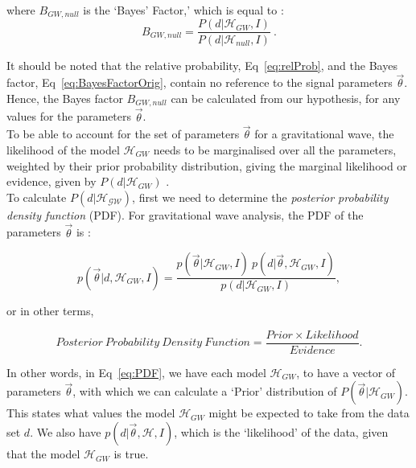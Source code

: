 \documentclass{article}
\begin{document}
   where $B_{GW, null}$ is the `Bayes' Factor,' which is equal to \cite{BaeStats}:\\
  \begin{equation} \label{eq:BayesFactorOrig}
  B_{GW, null} = \frac{P(d|  \mathcal{H}_{GW},I)}{P(d|  \mathcal{H}_{null},I)} \ .
  \end{equation}
 
It should be noted that the relative probability, Eq~\ref{eq:relProb}, and the Bayes factor, Eq~\ref{eq:BayesFactorOrig}, contain no reference to the signal parameters $\vec{\theta}$. Hence, the Bayes factor $B_{GW, null}$ can be calculated from our hypothesis, for any values for the parameters $\vec{\theta}$.\\

 To be able to account for the set of parameters $\vec{\theta}$ for a gravitational wave, the likelihood of the model $\mathcal{H}_{GW}$ needs to be marginalised over all the parameters, weighted by their prior probability distribution, giving the marginal likelihood or evidence, given by $P(d|\mathcal{H}_{GW})$  \cite{BaeStats}.\\
 

To calculate $P(d|\mathcal{H_{GW}})$, first we need to determine the \textit{posterior probability density function} (PDF). For gravitational wave analysis, the PDF of the parameters $\vec{\theta}$ is \cite{RSmith}:

\begin{equation} \label{eq:PDF}
p(\vec{\theta}|d, \mathcal{H}_{GW}, I)  = \frac{p(\vec{\theta}| \mathcal{H}_{GW}, I) \ p(d|\vec{\theta},  \mathcal{H}_{GW}, I) }  { p(d|\mathcal{H}_{GW}, I)},
\end{equation} 

or in other terms, 

\begin{equation} \label{eq:englishTheorem}
{ Posterior \ Probability \ Density \ Function}  = \frac{ Prior  \times Likelihood}{Evidence}. \nonumber
\end{equation} 

In other words, in Eq~\ref{eq:PDF}, we have each model $ \mathcal{H}_{GW}$, to have a vector of parameters $\vec{\theta}$, with which we can calculate a `Prior' distribution of $P(\vec{\theta}| \mathcal{H}_{GW})$. This states what values the model $ \mathcal{H}_{GW}$ might be expected to take from the data set $d$. We also have $p(d|\vec{\theta},  \mathcal{H}, I)$, which is the `likelihood' of the data, given that the model $ \mathcal{H}_{GW}$ is true.\\
\end{document}
